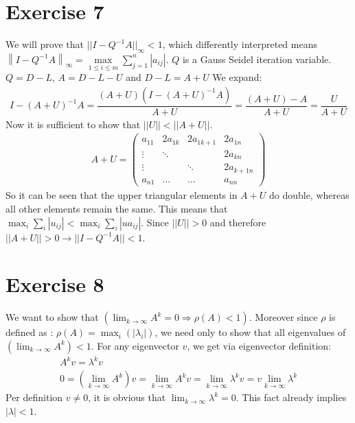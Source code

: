 \section{Exercise 7}

We will prove that $||I-Q^{-1}A||_\infty < 1 $, which differently interpreted means $  \left \|  I-Q^{-1}A \right \| _\infty = \max \limits _{1 \leq i \leq m} \sum _{j=1} ^n | a_{ij} |$.
$Q $ is a Gauss Seidel iteration variable. $Q = D-L$, $A = D - L - U$ and $ D - L = A + U$
We expand:
\begin{gather*}
I - (A + U ) ^{-1} A  = \dfrac{(A+U)(I - (A + U ) ^{-1} A )}{A+U} = \dfrac{(A+U) - A}{A+U} = \dfrac{U}{A+U}
\end{gather*}
Now it is sufficient to show that $||U|| < ||A+U||$.
\begin{gather*}
A+U = \left( \begin{array}{cccc}
a_{11} & 2 a_{1k} & 2 a_{1k+1} & 2 a_{1n} \\
\vdots & \ddots & & 2 a_{kn}  \\
\vdots & & \ddots & 2 a_{k+1n}\\
a_{n1} & \hdots& \hdots & a_{nn} 
\end{array} \right)
\end{gather*}
So it can be seen that the upper triangular elements in $A+U$ do double, whereas all other elements remain the same. This means that $\max_i \sum\limits_i |u_{ij}| < \max_i \sum\limits_i |ua_{ij}| $. Since $||U|| > 0 $ and therefore $||A+U|| > 0 \rightarrow ||I - Q^{-1}A|| < 1 $.
\section{Exercise 8}
We want to show that $\left(\lim_{k \to \infty}A^k = 0 \Rightarrow \rho(A) < 1\right)$.
Moreover since $\rho$ is defined as : $\rho(A) = \max_i(|\lambda_i|)$, we need only to show that all eigenvalues of $\left(\lim_{k \to \infty} A^k \right) < 1 $. For any eigenvector $v$, we get via eigenvector definition:
\begin{gather*}
A^k v = \lambda^k v \\
0 = \left(\lim_{k \to \infty}A^k \right) v = 
\lim_{k \to \infty}A^k v = 
\lim_{k \to \infty} \lambda^k v  = v \lim_{k \to \infty} \lambda^k
\end{gather*}
Per definition $v \neq 0$, it is obvious that $\lim_{k \to \infty} \lambda^k = 0$. This fact already implies $|\lambda| < 1$.

